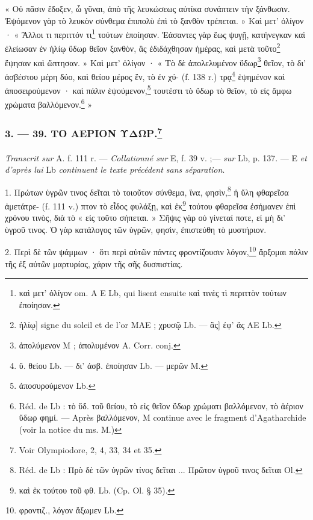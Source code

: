 \documentclass[landscape, a4paper, 11pt, oneside, polutonikogreek, french]{article}
\begin{document}
« Οὐ πᾶσιν ἔδοξεν, ὦ γῦναι, ἀπὸ τῆς λευκώσεως αὐτίκα συνάπτειν τὴν ξάνθωσιν. Ἑψόμενον γὰρ τὸ λευκὸν σύνθεμα ἐπιπολὺ ἐπὶ τὸ ξανθὸν τρέπεται. » Καὶ μετ' ὀλίγον · « Ἄλλοι τι περιττόν τι\footnote{καὶ μετ' ὀλίγον om. A E Lb, qui lisent ensuite καὶ τινὲς τὶ περιττὸν τούτων ἐποίησαν.} τούτων ἐποίησαν. Ἐάσαντες γὰρ ἕως ψυγῇ, κατήνεγκαν καὶ ἐλείωσαν ἐν ἡλίῳ ὕδωρ θεῖον ξανθὸν, ἃς ἐδιδάχθησαν ἡμέρας, καὶ μετὰ τοῦτο\footnote{ἡλίῳ] signe du soleil et de l'or MAE ; χρυσῷ Lb. --- ἃς] ἐφ' ἃς AE Lb.} ἕψησαν καὶ ὤπτησαν. » Καὶ μετ' ὀλίγον · « Τὸ δὲ ἀπολελυμένον ὕδωρ\footnote{ἀπολύμενον M ; ἀπολυμένον A. Corr. conj.} θεῖον, τὸ δι' ἀσβέστου μέρη δύο, καὶ θείου μέρος ἓν, τὸ ἐν χύ- (f. 138 r.) τρᾳ\footnote{ὕ. θείου Lb. --- δι' ἀσβ. ἐποίησαν Lb. --- μερῶν M.} ἑψημένον καὶ ἀποσειρούμενον · καὶ πάλιν ἑψούμενον,\footnote{ἀποσυρούμενον Lb.} τουτέστι τὸ ὕδωρ τὸ θεῖον, τὸ εἰς ἄμφω χρώματα βαλλόμενον.\footnote{Réd. de Lb : τὸ ὕδ. τοῦ θείου, τὸ εἰς θεῖον ὕδωρ χρώματι βαλλόμενον, τὸ ἀέριον ὕδωρ φημί. --- Après βαλλόμενον, M continue avec le fragment d'Agatharchide (voir la notice du ms. M.)} »
\clearpage
\bigskip
\centerline{\EightStarTaper}
\centerline{\EightStarTaper\EightStarTaper}
\bigskip

\subsubsection[3. --- 39. ΤΟ ΑΕΡΙΟΝ ΥΔΩΡ.]{3. --- 39. ΤΟ ΑΕΡΙΟΝ ΥΔΩΡ.\footnote{Voir Olympiodore, 2, 4, 33, 34 et 35.}}
\paragraph{}
\emph{Transcrit sur} A. f. 111 r. --- \emph{Collationné sur} E, f. 39 v. ;--- \emph{sur} Lb, p. 137. --- E \emph{et d'après lui} Lb \emph{continuent le texte précédent sans séparation}.

\bigskip

1. Πρώτων ὑγρῶν τινος δεῖται τὸ τοιοῦτον σύνθεμα, ἵνα, φησὶν,\footnote{Réd. de Lb : Πρὸ δὲ τῶν ὐγρῶν τίνος δεῖται ... Πρῶτον ὑγροῦ τινος δεῖται Ol.} ἡ ὕλη φθαρεῖσα ἀμετάτρε- (f. 111 v.) πτον τὸ εἶδος φυλάξῃ, καὶ ἐκ\footnote{καὶ ἐκ τούτου τοῦ φθ. Lb. (Cp. Ol. § 35).} τούτου φθαρεῖσα ἐσήμανεν ἐπὶ χρόνου τινὸς, διὰ τὸ « εἰς τοῦτο σήπεται. » Σῆψις γὰρ οὐ γίνεταί ποτε, εἰ μὴ δι' ὑγροῦ τινος. Ὁ γὰρ κατάλογος τῶν ὑγρῶν, φησὶν, ἐπιστεύθη τὸ μυστήριον.

2. Περὶ δὲ τῶν ψάμμων · ὅτι περὶ αὐτῶν πάντες φροντίζουσιν λόγον,\footnote{φροντιζ., λόγον ἄξωμεν Lb.} ἄρξομαι πάλιν τῆς ἐξ αὐτῶν μαρτυρίας, χάριν τῆς σῆς δυσπιστίας.
\end{document}
